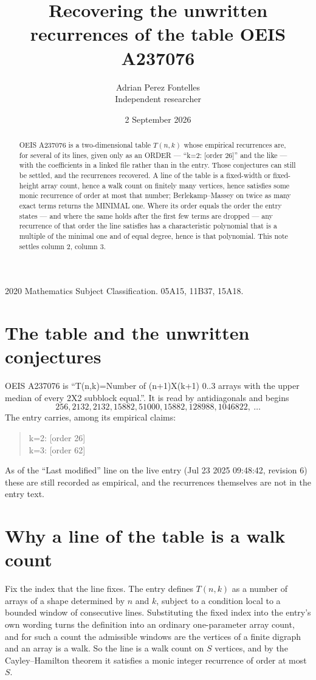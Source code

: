 \documentclass[11pt,a4paper]{article}
\title{Recovering the unwritten recurrences of the table OEIS A237076}
\author{Adrian Perez Fontelles\\ \small Independent researcher}
\date{2 September 2026}
\theoremstyle{plain}
\theoremstyle{definition}
\begin{document}
\maketitle

\begin{abstract}
OEIS A237076 is a two-dimensional table $T(n,k)$ whose empirical recurrences are, for several of
its lines, given only as an ORDER --- ``k=2: [order 26]'' and the like --- with the
coefficients in a linked file rather than in the entry. Those conjectures can still be settled,
and the recurrences recovered. A line of the table is a fixed-width or fixed-height array
count, hence a walk count on finitely many vertices, hence satisfies some monic recurrence of
order at most that number; Berlekamp--Massey on twice as many exact terms returns the MINIMAL
one. Where its order equals the order the entry states --- and where the same holds after the
first few terms are dropped --- any recurrence of that order the line satisfies has a
characteristic polynomial that is a multiple of the minimal one and of equal degree, hence is
that polynomial. This note settles column 2, column 3.
\end{abstract}

\noindent\small 2020 Mathematics Subject Classification. 05A15, 11B37, 15A18.\normalsize

\section{The table and the unwritten conjectures}

OEIS A237076 is ``T(n,k)=Number of (n+1)X(k+1) 0..3 arrays with the upper median of every 2X2 subblock equal.''. It is read by antidiagonals and begins
\[
256, 2132, 2132, 15882, 51000, 15882, 128988, 1046822,\ \dots
\]
The entry carries, among its empirical claims:
\begin{quote}\small
k=2: [order 26]\\
k=3: [order 62]
\end{quote}
As of the ``Last modified'' line on the live entry (Jul 23 2025 09:48:42, revision 6) these are still
recorded as empirical, and the recurrences themselves are not in the entry text.

\section{Why a line of the table is a walk count}

Fix the index that the line fixes. The entry defines $T(n,k)$ as a number of arrays of a shape
determined by $n$ and $k$, subject to a condition local to a bounded window of consecutive
lines. Substituting the fixed index into the entry's own wording turns the definition into an
ordinary one-parameter array count, and for such a count the admissible windows are the
vertices of a finite digraph and an array is a walk. So the line is a walk count on $S$
vertices, and by the Cayley--Hamilton theorem it satisfies a monic integer recurrence of order
at most $S$.
\end{document}
